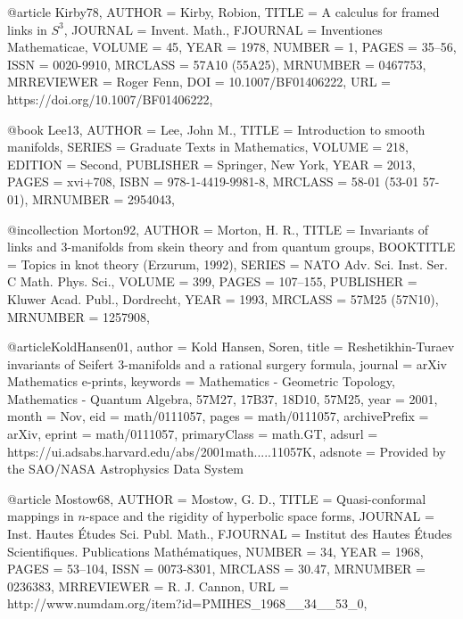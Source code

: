 @article {Kirby78,
    AUTHOR = {Kirby, Robion},
     TITLE = {A calculus for framed links in {$S^{3}$}},
   JOURNAL = {Invent. Math.},
  FJOURNAL = {Inventiones Mathematicae},
    VOLUME = {45},
      YEAR = {1978},
    NUMBER = {1},
     PAGES = {35--56},
      ISSN = {0020-9910},
   MRCLASS = {57A10 (55A25)},
  MRNUMBER = {0467753},
MRREVIEWER = {Roger Fenn},
       DOI = {10.1007/BF01406222},
       URL = {https://doi.org/10.1007/BF01406222},
}

@book {Lee13,
    AUTHOR = {Lee, John M.},
     TITLE = {Introduction to smooth manifolds},
    SERIES = {Graduate Texts in Mathematics},
    VOLUME = {218},
   EDITION = {Second},
 PUBLISHER = {Springer, New York},
      YEAR = {2013},
     PAGES = {xvi+708},
      ISBN = {978-1-4419-9981-8},
   MRCLASS = {58-01 (53-01 57-01)},
  MRNUMBER = {2954043},
}

@incollection {Morton92,
    AUTHOR = {Morton, H. R.},
     TITLE = {Invariants of links and {$3$}-manifolds from skein theory and
              from quantum groups},
 BOOKTITLE = {Topics in knot theory ({E}rzurum, 1992)},
    SERIES = {NATO Adv. Sci. Inst. Ser. C Math. Phys. Sci.},
    VOLUME = {399},
     PAGES = {107--155},
 PUBLISHER = {Kluwer Acad. Publ., Dordrecht},
      YEAR = {1993},
   MRCLASS = {57M25 (57N10)},
  MRNUMBER = {1257908},
}

@article{KoldHansen01,
       author = {Kold Hansen, Soren},
        title = {Reshetikhin-Turaev invariants of Seifert 3-manifolds and a rational surgery formula},
      journal = {arXiv Mathematics e-prints},
     keywords = {Mathematics - Geometric Topology, Mathematics - Quantum Algebra, 57M27, 17B37, 18D10, 57M25},
         year = {2001},
        month = {Nov},
          eid = {math/0111057},
        pages = {math/0111057},
archivePrefix = {arXiv},
       eprint = {math/0111057},
 primaryClass = {math.GT},
       adsurl = {https://ui.adsabs.harvard.edu/abs/2001math.....11057K},
      adsnote = {Provided by the SAO/NASA Astrophysics Data System}
}



@article {Mostow68,
    AUTHOR = {Mostow, G. D.},
     TITLE = {Quasi-conformal mappings in {$n$}-space and the rigidity of
              hyperbolic space forms},
   JOURNAL = {Inst. Hautes \'{E}tudes Sci. Publ. Math.},
  FJOURNAL = {Institut des Hautes \'{E}tudes Scientifiques. Publications
              Math\'{e}matiques},
    NUMBER = {34},
      YEAR = {1968},
     PAGES = {53--104},
      ISSN = {0073-8301},
   MRCLASS = {30.47},
  MRNUMBER = {0236383},
MRREVIEWER = {R. J. Cannon},
       URL = {http://www.numdam.org/item?id=PMIHES_1968__34__53_0},
}
	

